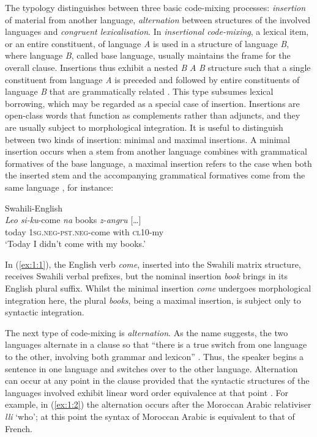 The typology distinguishes between three basic code-mixing processes: \textit{insertion} of material from another language, \textit{alternation} between structures of the involved languages and \textit{congruent lexicalisation}. In \textit{insertional code-mixing}, a lexical item, or an entire constituent, of language \textit{A} is used in a structure of language \textit{B}, where language \textit{B}, called base language, usually maintains the frame for the overall clause. Insertions thus exhibit a nested \textit{B} \textit{A} \textit{B} structure such that a single constituent from language \textit{A} is preceded and followed by entire constituents of language \textit{B} that are grammatically related \citep[cf.][61--69]{muysken-bilingual-2000}. This type subsumes lexical borrowing, which may be regarded as a special case of insertion. Insertions are open-class words that function as complements rather than adjuncts, and they are usually subject to morphological integration. It is useful to distinguish between two kinds of insertion: minimal and maximal insertions. A minimal insertion occurs when a stem from another language combines with grammatical formatives of the base language, a maximal insertion refers to the case when both the inserted stem and the accompanying grammatical formatives come from the same language \citep[cf.][]{auer2014}, for instance:

\ea{\label{ex:1:1}} 
Swahili-English \citep[][80]{myers-scotton-duelling-1993}\\
\gll \textit{Leo} \textit{si-ku}-come \textit{na} books \textit{z-angru} {[\dots]}\\
	today \textsc{1sg.neg-pst.neg}-come with {} \textsc{cl10}-my\\
\glt `Today I didn't come with my books.' 
\z

\noindent In (\ref{ex:1:1}), the English verb \textit{come}, inserted into the Swahili matrix structure, receives Swahili verbal prefixes, but the nominal insertion \textit{book} brings in its English plural suffix. Whilst the minimal insertion \textit{come} undergoes morphological integration here, the plural \textit{books}, being a maximal insertion, is subject only to syntactic integration.

The next type of code-mixing is \textit{alternation}. As the name suggests, the two languages alternate in a clause so that ``there is a true switch from one language to the other, involving both grammar and lexicon'' \citep[5]{muysken-bilingual-2000}. Thus, the speaker begins a sentence in one language and switches over to the other language. Alternation can occur at any point in the clause provided that the syntactic structures of the languages involved exhibit linear word order equivalence at that point \citep[cf.][114]{muysken-bilingual-2000}. For example, in (\ref{ex:1:2}) the alternation occurs after the Moroccan Arabic relativiser \textit{lli} `who'; at this point the syntax of Moroccan Arabic is equivalent to that of French.

